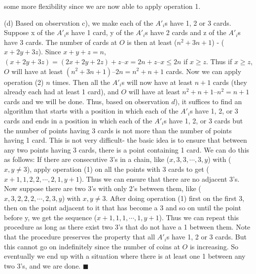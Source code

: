 \documentclass[a4paper,11pt]{book}
\begin{document}
some more flexibility since we are now able to apply
operation 1.
\par\noindent (d) Based on observation c), we make each of the $A'_{i}$s have 1, 2 or
3 cards. Suppose x of the $A'_{i}$s have 1 card, y of the $A'_{i}$s have 2
cards and z of the $A'_{i}$s have 3 cards. The number of cards at $O$
is then at least ($n^2+3n+1$) - ($x +2y + 3z$). Since $x + y + z = n$, $(x +
2y + 3z) = (2x + 2y + 2z) + z – x = 2n + z – x \le 2n$ if $x \ge z$. Thus if
$x \ge z$, $O$ will have at least $(n^2+3n+1) – 2n = n^2+n + 1$ cards. Now
we can apply operation (2) $n$ times. Then all the $A'_{i}$s will now
have at least $n + 1$ cards (they already each had at least 1
card), and $O$ will have at least $n^2 + n + 1 – n^2 = n + 1$ cards and
we will be done.
Thus, based on observation $d$), it suffices to find an algorithm
that starts with a position in which each of the $A'_{i}$s have 1, 2, or 3
cards and ends in a position in which each of the $A'_{i}$s have 1, 2, or
3 cards but the number of points having 3 cards is not more than
the number of points having 1 card. This is not very difficult- the
basic idea is to ensure that between any two points having 3
cards, there is a point containing 1 card. We can do this as follows:
If there are consecutive 3’s in a chain, like ($x, 3, 3, \cdots, 3, y$) with
($x, y \neq 3$), apply operation (1) on all the points with 3 cards to get
($x + 1, 1, 2, 2, \cdots, 2, 1, y+1$). Thus we can ensure that there are no
adjacent 3’s. Now suppose there are two 3’s with only 2’s between
them, like ($x, 3, 2, 2, 2,\cdots,2, 3, y$) with $x, y \neq 3$. After doing operation
(1) first on the first 3, then on the point adjacent to it that has
become a 3 and so on until the point before y, we get the sequence
($x+1, 1, 1,\cdots,1, y+1$).
Thus we can repeat this procedure as long as there exist two
3’s that do not have a 1 between them. Note that the procedure
preserves the property that all $A'_{i}$s have 1, 2 or 3 cards. But this
cannot go on indefinitely since the number of coins at $O$ is
increasing. So eventually we end up with a situation where there
is at least one 1 between any two 3’s, and we are done. \hfill $\blacksquare$ \\
\end{document}
